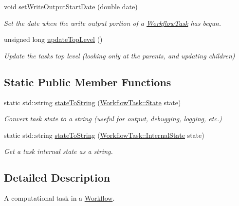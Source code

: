\begin{DoxyCompactItemize}
void \hyperlink{classwrench_1_1_workflow_task_a6ab325eecb0736fbb90be1143440b18f}{set\+Write\+Output\+Start\+Date} (double date)
\begin{DoxyCompactList}\small\item\em Set the date when the write output portion of a \hyperlink{classwrench_1_1_workflow_task}{Workflow\+Task} has begun. \end{DoxyCompactList}\item 
unsigned long \hyperlink{classwrench_1_1_workflow_task_afe6505deda397a0c54a5326941cdd79d}{update\+Top\+Level} ()
\begin{DoxyCompactList}\small\item\em Update the task\textquotesingle{}s top level (looking only at the parents, and updating children) \end{DoxyCompactList}\end{DoxyCompactItemize}
\subsection*{Static Public Member Functions}
\begin{DoxyCompactItemize}
\item 
static std\+::string \hyperlink{classwrench_1_1_workflow_task_a542a6f96bea2d2e67d21bc32c0151e73}{state\+To\+String} (\hyperlink{classwrench_1_1_workflow_task_a1184f3d7aea21e1c87a9b17e84f1f92a}{Workflow\+Task\+::\+State} state)
\begin{DoxyCompactList}\small\item\em Convert task state to a string (useful for output, debugging, logging, etc.) \end{DoxyCompactList}\item 
static std\+::string \hyperlink{classwrench_1_1_workflow_task_ae018f30098863d46fb32c5a91691a472}{state\+To\+String} (\hyperlink{classwrench_1_1_workflow_task_aa2b860941b37263c26385fd076502e04}{Workflow\+Task\+::\+Internal\+State} state)
\begin{DoxyCompactList}\small\item\em Get a task internal state as a string. \end{DoxyCompactList}\end{DoxyCompactItemize}


\subsection{Detailed Description}
A computational task in a \hyperlink{classwrench_1_1_workflow}{Workflow}. 

